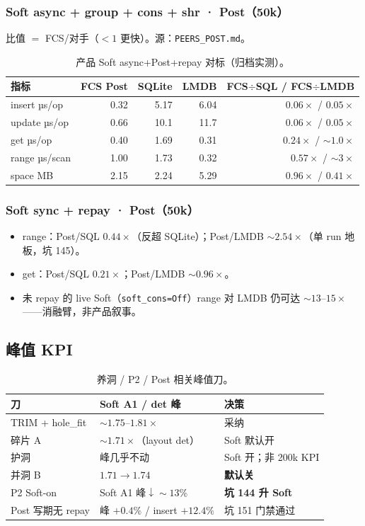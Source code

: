 \subsubsection{Soft async + group + cons + shr · Post（50k）}
比值 $=$ FCS/对手（$<1$ 更快）。源：\texttt{PEERS\_POST.md}。
\begin{table}[ht]
\centering
\small
\begin{tabular}{@{}lrrrr@{}}
\toprule
指标 & FCS Post & SQLite & LMDB & FCS$\div$SQL / FCS$\div$LMDB \\
\midrule
insert µs/op & 0.32 & 5.17 & 6.04 & $\mathbf{0.06\times}$ / $\mathbf{0.05\times}$ \\
update µs/op & 0.66 & 10.1 & 11.7 & $\mathbf{0.06\times}$ / $\mathbf{0.05\times}$ \\
get µs/op & 0.40 & 1.69 & 0.31 & $0.24\times$ / $\sim 1.0\times$ \\
range µs/scan & 1.00 & 1.73 & 0.32 & $0.57\times$ / $\sim 3\times$ \\
space MB & 2.15 & 2.24 & 5.29 & $0.96\times$ / $\mathbf{0.41\times}$ \\
\bottomrule
\end{tabular}
\caption{产品 Soft async+Post+repay 对标（归档实测）。}
\end{table}

\subsubsection{Soft sync + repay · Post（50k）}
\begin{itemize}[leftmargin=1.6em]
  \item range：Post/SQL $\mathbf{0.44\times}$（反超 SQLite）；Post/LMDB $\sim 2.54\times$（单 run 地板，坑 145）。
  \item get：Post/SQL $0.21\times$；Post/LMDB $\sim 0.96\times$。
  \item 未 repay 的 live Soft（\texttt{soft\_cons=Off}）range 对 LMDB 仍可达 $\sim 13$--$15\times$——消融臂，非产品叙事。
\end{itemize}

\subsection{峰值 KPI}
\begin{table}[ht]
\centering
\small
\begin{tabular}{@{}llp{5.5cm}@{}}
\toprule
刀 & Soft A1 / det 峰 & 决策 \\
\midrule
TRIM + hole\_fit & $\sim 1.75$--$1.81\times$ & 采纳 \\
碎片 A & $\sim 1.71\times$（layout det） & Soft 默认开 \\
护洞 & 峰几乎不动 & Soft 开；非 200k KPI \\
并洞 B & $1.71\to 1.74$ & \textbf{默认关} \\
P2 Soft-on & Soft A1 峰$\downarrow\sim 13\%$ & \textbf{坑 144 升 Soft} \\
Post 写期无 repay & 峰 $+0.4\%$ / insert $+12.4\%$ & 坑 151 门禁通过 \\
\bottomrule
\end{tabular}
\caption{养洞 / P2 / Post 相关峰值刀。}
\end{table}

